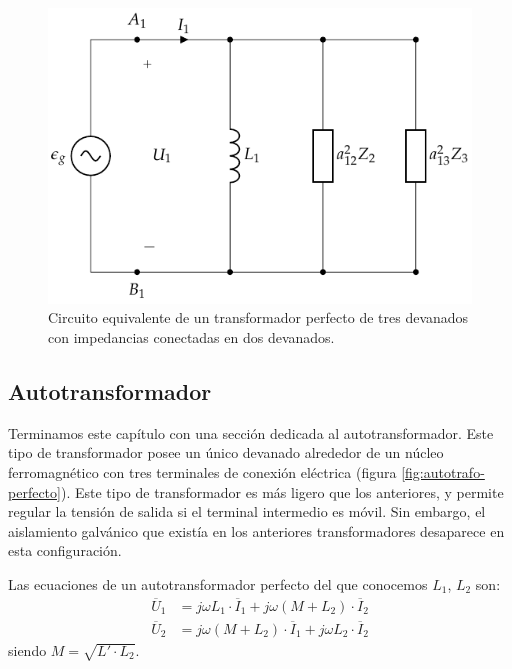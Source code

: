 \begin{figure}
  \centering
  \includegraphics[height=0.25\textheight]{../figs/TrafoPerfectoVariosDevanados_Impedancia_Equivalente.pdf}
  \caption{Circuito equivalente de un transformador perfecto de tres devanados con impedancias conectadas en dos devanados.}
  \label{fig:trafo-perfecto-ideal-varios-devanados-impedancia-equivalente}
\end{figure}

\subsection{Autotransformador}
\label{sec:autotrafo}

Terminamos este capítulo con una sección dedicada al autotransformador. Este tipo de transformador posee un único devanado alrededor de un núcleo ferromagnético con tres terminales de conexión eléctrica (figura \ref{fig:autotrafo-perfecto}). Este tipo de transformador es más ligero que los anteriores, y permite regular la tensión de salida si el terminal intermedio es móvil. Sin embargo, el aislamiento galvánico que existía en los anteriores transformadores desaparece en esta configuración.

Las ecuaciones de un autotransformador perfecto del que conocemos $L_1$, $L_2$ son:
\begin{align*}
  \overline{U}_1 &= j \omega L_1 \cdot \overline{I}_1 + j \omega (M + L_2) \cdot \overline{I}_2\\
  \overline{U}_2 &= j \omega (M + L_2) \cdot \overline{I}_1 + j \omega L_2 \cdot \overline{I}_2
\end{align*}
siendo $M = \sqrt{L' \cdot L_2}$.

